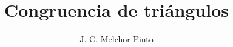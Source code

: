 \documentclass[12pt]{guia}
\title{Congruencia de triángulos}
\author{J. C. Melchor Pinto}
\begin{document}
\pagestyle{headandfoot}
\addpoints
\INFO
\vspace{-0.9cm}
\begin{multicols}{2}
    
    
    \columnbreak
    
\end{multicols}



\begin{questions}
    \questionboxed[10] 
    \questionboxed[10] 
    \questionboxed[10] 
    \questionboxed[10] 
    \questionboxed[10] 
    \questionboxed[10] 
    \questionboxed[10] 
    \questionboxed[10] 
    \questionboxed[10] 
    \questionboxed[10] 
\end{questions}
\end{document}
